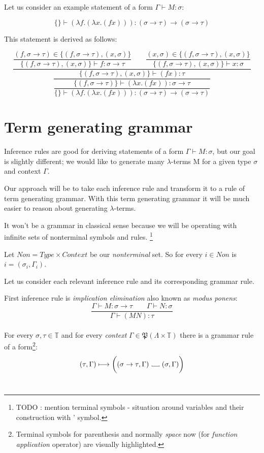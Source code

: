 \documentclass[12pt,a4paper]{report}
\newcommand{\Lets}{Let us\xspace}
\newcommand{\lterms}{$\lambda$-terms\xspace}
\newcommand{\turst}[3]{$#1 \vdash #2 : #3$\xspace}
\newcommand{\GMS}{\turst{\Gamma}{M}{\sigma}}
\newcommand\Vtextvisiblespace[1][.3em]{%
  \mbox{\kern.06em\vrule height.3ex}%
  \vbox{\hrule width#1}%
  \hbox{\vrule height.3ex}}
\begin{document}
	\Lets consider an example statement of a form \GMS :
	
	\[
		\{\} \vdash (\lambda f . (\lambda x . (f x) )) : 
		(\sigma \rightarrow \tau) \rightarrow ( \sigma \rightarrow \tau ) 
	\]
		
	This statement is derived as follows: 
	
	\begin{equation*}
	\dfrac{
		\dfrac{ (f,\sigma \rightarrow \tau) \in \{ (f,\sigma \rightarrow \tau) , (x,\sigma)  \}  }
		     { \{ (f,\sigma \rightarrow \tau) , (x,\sigma)  \} \vdash f : \sigma \rightarrow \tau }
		\qquad
		\dfrac{ (x,\sigma) \in \{ (f,\sigma \rightarrow \tau) , (x,\sigma)  \}  }
		     { \{ (f,\sigma \rightarrow \tau) , (x,\sigma)  \} \vdash x : \sigma }
		 }
		 {
			\dfrac{		 	
		 		\{ (f,\sigma \rightarrow \tau) , (x,\sigma)  \} \vdash (f x) : \tau
		 	}{
				\dfrac{\{ (f,\sigma \rightarrow \tau) \} \vdash (\lambda x . (f x) ) : 
				\sigma \rightarrow \tau}
				{ \{ \} \vdash (\lambda f . (\lambda x . (f x) ) ) 
				  : (\sigma \rightarrow \tau) \rightarrow (\sigma \rightarrow \tau) }
		 	}
		 }
	\end{equation*}		
	
\section{Term generating grammar}

Inference rules are good for deriving statements of a form \GMS, but our
goal is slightly different; we would like to generate many \lterms M for a given type 
$\sigma$ and context $\Gamma$.

Our approach will be to take each inference rule and transform it to a rule of term generating
grammar. With this term generating grammar it will be much easier to reason about generating 
\lterms.
	
It won't be a grammar in classical sense because we will be operating with infinite sets of
nonterminal symbols and rules. \footnote{TODO : mention terminal symbols - situation around 
variables and their construction with ' symbol.}

Let $Non = Type \times Context $ be our {\it nonterminal} set. 
So for every $i \in Non$ is $i = (\sigma_i , \Gamma_i )$.

\Lets consider each relevant inference rule and its corresponding grammar rule.

First inference rule is {\it implication elimination} also known as 
{\it modus ponens}: 
\[
	\frac{\Gamma \vdash M : \sigma \rightarrow \tau \qquad
		  \Gamma \vdash N : \sigma }
	     {\Gamma \vdash (M N) : \tau }
\]
\\
For every $\sigma, \tau \in \mathbb{T}$ and for every {\it context} 
$\Gamma \in \mathfrak P \left({\Lambda \times  \mathbb{T}}\right)$ there is a grammar rule of a form\footnote{ 
Terminal symbols for parenthesis and normally {\it space} now \textvisiblespace \quad (for {\it function application} operator) are visually highlighted. }: 
\[	
	( \tau , \Gamma )  \longmapsto
	\bigg( ( \sigma \rightarrow \tau , \Gamma ) 
	  \mbox{ \Vtextvisiblespace[1em] } ( \sigma , \Gamma ) \bigg)
\]
\\
\end{document}
